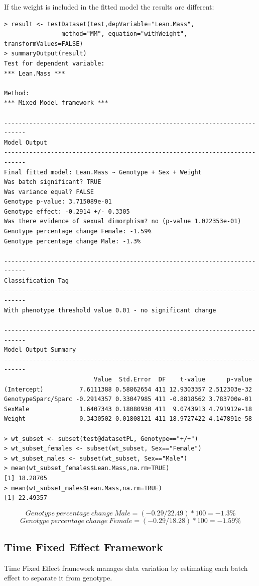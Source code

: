 \documentclass[12pt,a4paper]{article}
\begin{document}
If the weight is included in the fitted model the results are different:
\begingroup
\fontsize{8pt}{12pt}\selectfont
\begin{verbatim}
> result <- testDataset(test,depVariable="Lean.Mass", 
				method="MM", equation="withWeight", transformValues=FALSE)
> summaryOutput(result)
Test for dependent variable:
*** Lean.Mass ***

Method:
*** Mixed Model framework ***

----------------------------------------------------------------------------
Model Output
----------------------------------------------------------------------------
Final fitted model: Lean.Mass ~ Genotype + Sex + Weight
Was batch significant? TRUE
Was variance equal? FALSE
Genotype p-value: 3.715089e-01
Genotype effect: -0.2914 +/- 0.3305
Was there evidence of sexual dimorphism? no (p-value 1.022353e-01)
Genotype percentage change Female: -1.59%
Genotype percentage change Male: -1.3%

----------------------------------------------------------------------------
Classification Tag
----------------------------------------------------------------------------
With phenotype threshold value 0.01 - no significant change

----------------------------------------------------------------------------
Model Output Summary
----------------------------------------------------------------------------
                         Value  Std.Error  DF    t-value      p-value
(Intercept)          7.6111388 0.58862654 411 12.9303357 2.512303e-32
GenotypeSparc/Sparc -0.2914357 0.33047985 411 -0.8818562 3.783700e-01
SexMale              1.6407343 0.18080930 411  9.0743913 4.791912e-18
Weight               0.3430502 0.01808121 411 18.9727422 4.147891e-58

> wt_subset <- subset(test@datasetPL, Genotype=="+/+")
> wt_subset_females <- subset(wt_subset, Sex=="Female")
> wt_subset_males <- subset(wt_subset, Sex=="Male")
> mean(wt_subset_females$Lean.Mass,na.rm=TRUE)
[1] 18.28705
> mean(wt_subset_males$Lean.Mass,na.rm=TRUE)
[1] 22.49357
\end{verbatim}
\endgroup 
\[
Genotype\:percentage\:change\:Male = (-0.29/22.49)*100 = -1.3\%
\]
\[
Genotype\:percentage\:change\:Female = (-0.29/18.28)*100 = -1.59\%
\]

\subsection{Time Fixed Effect Framework}
Time Fixed Effect framework manages data variation by estimating each batch effect to separate it from genotype.
\end{document}
